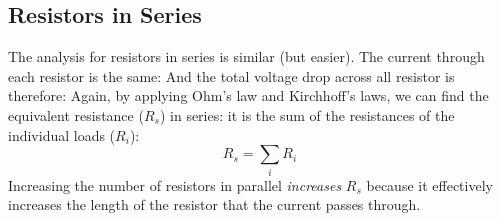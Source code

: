 %
%    
%
%    
%    
%
%  
%
%
%
%
\subsection{Resistors in Series}
\begin{figure}[ht]
  \centering
\end{figure}
The analysis for resistors in series is similar (but easier). The current
through each resistor is the same:
And the total voltage drop across all resistor is therefore:
%
%
%
%
Again, by applying Ohm's law and Kirchhoff's laws, we can find the equivalent
resistance ($R_s$) in series: it is the sum of the resistances of the
individual loads ($R_i$):
\begin{equation}
  \boxed{R_s=\sum_iR_i}
\end{equation}
Increasing the number of resistors in parallel \emph{increases} $R_s$ because
it effectively increases the length of the resistor that the current passes
through.
%
%
%
%
%
%
%
%
